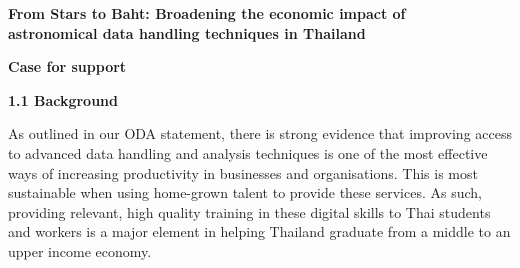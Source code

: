 \documentclass[11pt]{article}
\begin{document}
  \setcounter{figure}{0}
  \noindent
  {\LARGE \bf From Stars to Baht: Broadening the economic impact of \\
  astronomical data handling techniques in Thailand}
  
  \vspace{3mm}
  \noindent
  {\LARGE \bf Case for support}
  
  
  \vspace{3mm}
  \noindent
  {\large \bf 1.1 Background}
  
  \noindent
  As outlined in our ODA statement, there is strong evidence that improving access to advanced data handling and analysis techniques is one of the most effective ways of increasing productivity in businesses and organisations. This is most sustainable when using home-grown talent to provide these services. As such, providing relevant, high quality training in these digital skills to Thai students and workers is a major element in helping Thailand graduate from a middle to an upper income economy. 
\end{document}
